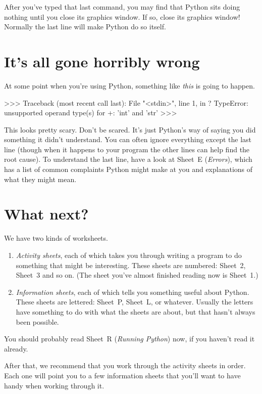 \documentclass[pdftex]{wsheet}
\begin{document}
After you've typed that last command, you may find that
Python sits doing nothing until you close its graphics window.
If so, close its graphics window! Normally the last line will 
make Python do so itself.

\section{It's all gone horribly wrong}

At some point when you're using Python, something like \emph{this}
is going to happen.

\begin{interaction}
>>> 
Traceback (most recent call last):
  File "<stdin>", line 1, in ?
TypeError: unsupported operand type(s) for +: 'int' and 'str'
>>>
\end{interaction}

This looks pretty scary. Don't be scared. It's just Python's
way of saying you did something it didn't understand. You can
often ignore everything except the last line (though when it 
happens to your program the other lines can help find the root
cause). To understand the last line, have a look at Sheet~E 
(\emph{Errors}), which has a list of common complaints Python 
might make at you and explanations of what they might mean.

\section{What next?}
We have two kinds of worksheets.
\begin{enumerate}
 \item \emph{Activity sheets}, each of which takes you through
       writing a program to do something that might be interesting.
       These sheets are numbered: Sheet~2, Sheet~3 and so on.
       (The sheet you've almost finished reading now is Sheet~1.)
 \item \emph{Information sheets}, each of which tells you something
       useful about Python.
       These sheets are lettered: Sheet~P, Sheet~L, or whatever.
       Usually the letters have something to do with what the
       sheets are about, but that hasn't always been possible.
\end{enumerate}

You should probably read Sheet~R (\emph{Running Python}) now,
if you haven't read it already.

After that, we recommend that you work through the activity sheets in order.
Each one will point you to a few information sheets that you'll
want to have handy when working through it.
\end{document}
